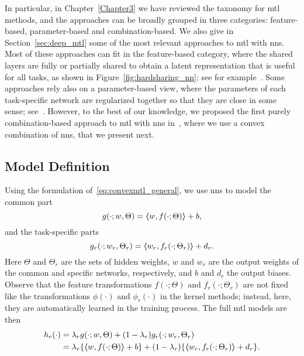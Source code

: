 %
In particular, in Chapter~\ref{Chapter3} we have reviewed the taxonomy for \acrshort{mtl} methods, and the approaches can be broadly grouped in three categories: feature-based, parameter-based and combination-based. 
We also give in Section~\ref{sec:deep_mtl} some of the most relevant approaches to \acrshort{mtl} with \acrshort{nns}. Most of these approaches can fit in the feature-based category, where the shared layers are fully or partially shared to obtain a latent representation that is useful for all tasks, as shown in Figure~\ref{fig:hardsharing_nn}; see for example~\cite{Caruana97, MisraSGH16,RuderBAS17}. Some approaches rely also on a parameter-based view, where the parameters of each task-specific network are regularized together so that they are close in some sense; see~\cite{Long015a, YangH17a}.
However, to the best of our knowledge, we proposed the first purely combination-based approach to \acrshort{mtl} with \acrshort{nns} in~\cite{RuizAD22_hais}, where we use a convex combination of \acrshort{nns}, that we present next.



\subsection{Model Definition}
Using the formulation of~\eqref{eq:convexmtl_general}, we use \acrshort{nns} to model the common part 
$$ g(\cdot; w, \Theta) = \bm{\left\langle} w, f(\cdot; \Theta) \bm{\right\rangle} + b,$$
and the task-specific parts
$$ g_r(\cdot; w_r, \Theta_r) =  \bm{\left\langle} w_r, f_r(\cdot; \Theta_r) \bm{\right\rangle} + d_r.$$
Here $\Theta$ and $\Theta_r$ are the sets of hidden weights, $w$ and $w_r$ are the output weights of the common and specific networks, respectively, and $b$ and $d_r$ the output biases.
Observe that the feature transformations $ f(\cdot; \Theta)$ and $f_r(\cdot; \Theta_r)$ are not fixed like the transformations $\phi(\cdot)$ and $\phi_r(\cdot)$ in the kernel methods; instead, here, they are automatically learned in the training process.
The full \acrshort{mtl} models are then
\begin{equation}
    \label{eq:convexmtl_nn}
    \begin{aligned}
        h_r(\cdot) &= \lambda_r g(\cdot; w, \Theta) + (1 - \lambda_r) g_r(\cdot; w_r, \Theta_r)
       \\&= \lambda_r \lbrace \dotp{w}{f(\cdot; \Theta)} + b \rbrace + (1 - \lambda_r) \lbrace \dotp{w_r}{f_r(\cdot; \Theta_r)} + d_r \rbrace.
    \end{aligned}    
\end{equation}


